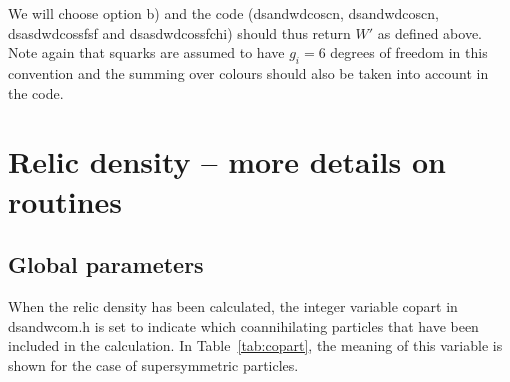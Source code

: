 \documentclass[a4paper,10pt,oneside]{book}
\newcommand{\code}[1]{\ft{#1}}
\newcommand{\ft}[1]{\textsf{#1}}
\begin{document}
We will choose option b) and the code (\code{dsandwdcoscn}, \code{dsandwdcoscn}, \code{dsasdwdcossfsf} and \code{dsasdwdcossfchi}) should thus return $W'$ as defined above. Note again that squarks are assumed to have $g_i=6$ degrees of freedom in this convention and the summing over colours should also be taken into account in the code.


\section{Relic density -- more details on routines}

\subsection{Global parameters}

When the relic density has been calculated, the integer variable \code{copart} in \code{dsandwcom.h} is set to indicate which coannihilating particles that have been included in the calculation. In Table~\ref{tab:copart}, the meaning of this variable is shown for the case of supersymmetric particles.
\end{document}
